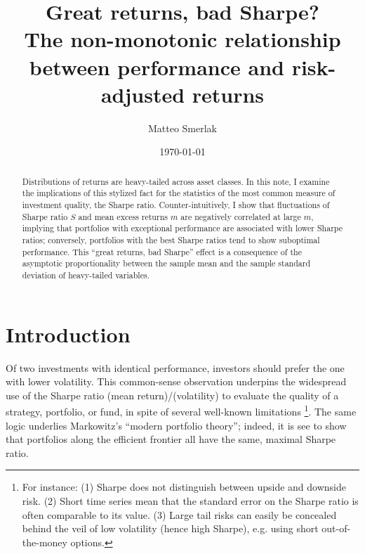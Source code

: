 \documentclass[
reprint,
amsmath,amssymb,
aps,
]{revtex4-2}
\begin{document}
\title{Great returns, bad Sharpe?\\ The non-monotonic relationship between performance and risk-adjusted returns}

\author{Matteo Smerlak}

\date{\today}

\begin{abstract}
    Distributions of returns are heavy-tailed across asset classes.
    In this note, I examine the implications of this stylized fact for the statistics of the most common measure of investment quality, the Sharpe ratio. 
    Counter-intuitively, I show that fluctuations of Sharpe ratio $S$ and mean excess returns $m$ are negatively correlated at large $m$, implying that portfolios with exceptional performance are associated with lower Sharpe ratios; conversely, portfolios with the best Sharpe ratios tend to show suboptimal performance. 
    This ``great returns, bad Sharpe'' effect is a consequence of the asymptotic proportionality between the sample mean and the sample standard deviation of heavy-tailed variables. 
 \end{abstract}

\maketitle 

\section{Introduction}

Of two investments with identical performance, investors should prefer the one with lower volatility. 
This common-sense observation underpins the widespread use of the Sharpe ratio (mean return)/(volatility) to evaluate the quality of a strategy, portfolio, or fund, in spite of several well-known limitations \footnote{
    For instance: (1) Sharpe does not distinguish between upside and downside risk. 
    (2) Short time series mean that the standard error on the Sharpe ratio is often comparable to its value.
    (3) Large tail risks can easily be concealed behind the veil of low volatility (hence high Sharpe), e.g. using short out-of-the-money options.
}. 
The same logic underlies Markowitz's ``modern portfolio theory''; indeed, it is see to show that portfolios along the efficient frontier all have the same, maximal Sharpe ratio. 
\end{document}
